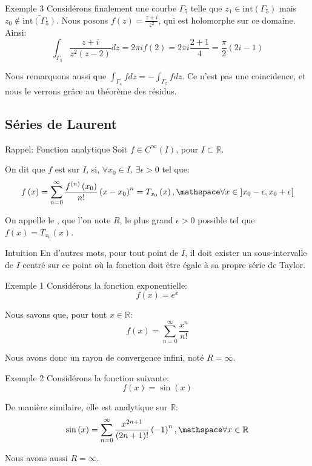 \documentclass[a4paper]{article}
\begin{document}
\begin{parag}{Exemple 3}
    Considérons finalement une courbe $\Gamma_5$ telle que $z_1 \in \text{int}\left(\Gamma_5\right)$ mais $z_0 \not \in \bar{\text{int}\left(\Gamma_5\right)}$. Nous posons $f\left(z\right) = \frac{z+i}{z^2}$, qui est holomorphe sur ce domaine. Ainsi: 
    \[\int_{\Gamma_5} \frac{z+i}{z^2 \left(z-2\right)}dz = 2\pi i f\left(2\right) = 2\pi i \frac{2 + 1}{4} = \frac{\pi}{2}\left(2i - 1\right)\]
    
    Nous remarquons aussi que $\int_{\Gamma_4} fdz = -\int_{\Gamma_5} fdz $. Ce n'est pas une coincidence, et nous le verrons grâce au théorème des résidus.
\end{parag}

\subsection{Séries de Laurent}
\begin{parag}{Rappel: Fonction analytique}
    Soit $f \in C^{\infty}\left(I\right)$, pour $I \subset \mathbb{R}$.

    On dit que $f$ est  sur $I$, si, $\forall x_0 \in I$, $\exists \epsilon > 0$ tel que: 
    \[f\left(x\right) = \sum_{n=0}^{\infty} \frac{f^{\left(n\right)}\left(x_0\right)}{n!} \left(x-x_0\right)^n = T_{x_0}\left(x\right), \mathspace \forall x \in \left]x_0 - \epsilon, x_0 + \epsilon\right[ \]

    On appelle le , que l'on note $R$, le plus grand $\epsilon > 0$ possible tel que $f\left(x\right) = T_{x_0}\left(x\right)$.
    
    \begin{subparag}{Intuition}
        En d'autres mots, pour tout point de $I$, il doit exister un sous-intervalle de $I$ centré sur ce point où la fonction doit être égale à sa propre série de Taylor.
    \end{subparag}
\end{parag}

\begin{parag}{Exemple 1}
    Considérons la fonction exponentielle: 
    \[f\left(x\right) = e^x\]
    
    Nous savons que, pour tout $x \in \mathbb{R}$: 
    \[f\left(x\right) = \sum_{n=0}^{\infty} \frac{x^n}{n!}\]
    
    Nous avons donc un rayon de convergence infini, noté $R = \infty$.
\end{parag}

\begin{parag}{Exemple 2}
    Considérons la fonction suivante: 
    \[f\left(x\right) = \sin\left(x\right)\]
    
    De manière similaire, elle est analytique sur $\mathbb{R}$: 
    \[\sin\left(x\right) = \sum_{n=0}^{\infty} \frac{x^{2n+1}}{\left(2n+1\right)!} \left(-1\right)^n, \mathspace \forall x \in \mathbb{R} \]

    Nous avons aussi $R = \infty$.
\end{parag}
\end{document}
